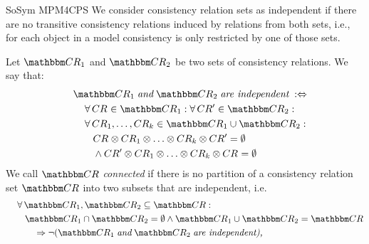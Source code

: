\begin{copiedFrom}{SoSym MPM4CPS}
We consider consistency relation sets as independent if there are no transitive consistency relations induced by relations from both sets, i.e., for each object in a model consistency is only restricted by one of those sets.

\begin{definition}
    \label{def:independence}
    Let $\consistencyrelationset{CR}_{1}$ and $\consistencyrelationset{CR}_{2}$ be two sets of consistency relations. We say that:
    \begin{align*}
        \formulaskip &
        \consistencyrelationset{CR}_{1} \mathtext{and} \consistencyrelationset{CR}_{2} \mathtext{are independent} \equivalentperdefinition \\
        & \formulaskip
        \forall \consistencyrelation{CR}{} \in \consistencyrelationset{CR}_{1} : \forall \consistencyrelation{CR'}{} \in \consistencyrelationset{CR}_{2} : \\
        & \formulaskip 
        \forall \consistencyrelation{CR}{1}, \dots, \consistencyrelation{CR}{k} \in \consistencyrelationset{CR}_{1} \cup \consistencyrelationset{CR}_{2} : \\
        & \formulaskip\formulaskip
        \consistencyrelation{CR}{} \concat \consistencyrelation{CR}{1} \concat \dots \concat \consistencyrelation{CR}{k} \concat \consistencyrelation{CR'}{} = \emptyset \\
        & \formulaskip\formulaskip
        \land \consistencyrelation{CR'}{} \concat \consistencyrelation{CR}{1} \concat \dots \concat \consistencyrelation{CR}{k} \concat \consistencyrelation{CR}{} = \emptyset
    \end{align*}
    We call $\consistencyrelationset{CR}$ \emph{connected} if there is no partition of a consistency relation set $\consistencyrelationset{CR}$ into two subsets that are independent, i.e.
    \begin{align*}
        \formulaskip &
        \forall \consistencyrelationset{CR}_{1}, \consistencyrelationset{CR}_{2} \subseteq \consistencyrelationset{CR} : \\
        & \formulaskip 
        \consistencyrelationset{CR}_{1} \cap \consistencyrelationset{CR}_{2} = \emptyset \land \consistencyrelationset{CR}_{1} \cup \consistencyrelationset{CR}_{2} = \consistencyrelationset{CR}  \\
        & \formulaskip\formulaskip
        \Rightarrow \neg (\consistencyrelationset{CR}_{1} \mathtext{and} \consistencyrelationset{CR}_{2} \mathtext{are independent),}
    \end{align*}
\end{definition}


\end{copiedFrom}
